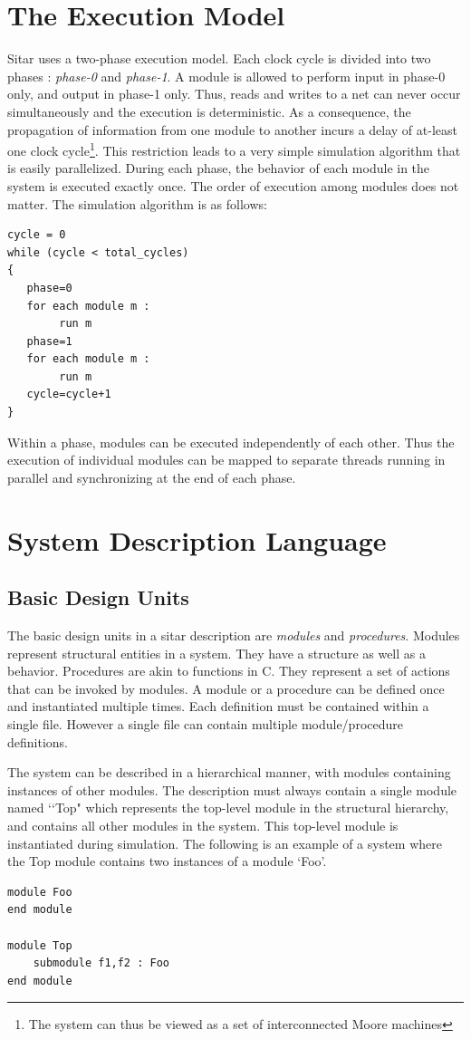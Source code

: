 \documentclass[12pt,a4paper]{article}
\begin{document}
\section{The Execution Model}\label{sec:ExecutionModel}
Sitar uses a two-phase execution model.
Each clock cycle is divided into two phases : {\em phase-0}
and {\em phase-1}. A module is allowed to perform input in
phase-0 only, and output in phase-1 only. Thus, reads and writes
to a net can never occur simultaneously and the execution is deterministic.
As a consequence, the propagation of information from one
module to another incurs a delay of at-least one clock cycle\footnote{
The system can thus be viewed as a set of interconnected Moore machines}.
%
This restriction leads to a very simple simulation algorithm
that is easily parallelized. During each phase, 
the behavior of each module in the system is executed exactly once.
The order of execution among modules does not matter.
The simulation algorithm is as follows:

\begin{verbatim}
cycle = 0
while (cycle < total_cycles)
{
   phase=0
   for each module m :
        run m
   phase=1
   for each module m :
        run m
   cycle=cycle+1
}
\end{verbatim}
Within a phase, modules can be executed independently of each other.
Thus the execution of individual modules can be mapped to 
separate threads running in parallel
and synchronizing at the end of each phase.


\section{System Description Language} \label{sec:Language}

\subsection{Basic Design Units}
The basic design units in a sitar description are {\em modules} and {\em procedures}.
Modules represent structural entities in a system. They have a structure as well
as a behavior. Procedures are akin to functions in C. They 
represent a set of actions that can be invoked by modules.
A module or a procedure can be defined once and instantiated multiple times.
Each definition must be contained within a single file. 
However a single file can contain multiple module/procedure definitions.



The system can be described in a hierarchical manner, 
with modules containing instances of
other modules.  The description must always contain a single module named
\lq\lq Top" which represents the top-level module in the structural
hierarchy, and contains all other modules in the system.  
This top-level module is instantiated during simulation.
%
The following is an example of a system 
where the Top module contains two instances 
of a module \lq Foo\rq.
\begin{verbatim}
module Foo
end module

module Top
    submodule f1,f2 : Foo
end module
\end{verbatim}
\end{document}
